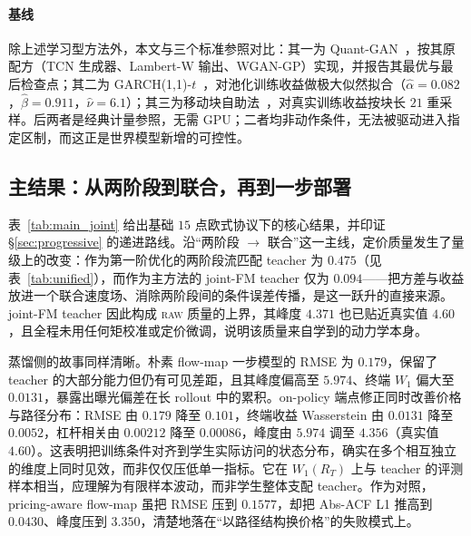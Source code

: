 \documentclass[11pt]{ctexart}
\newcommand{\raw}{\textsc{raw}}
\begin{document}
\paragraph{基线}
除上述学习型方法外，本文与三个标准参照对比：其一为 Quant-GAN~\citep{wiese2020quant}，按其原配方（TCN 生成器、Lambert-W 输出、WGAN-GP）实现，并报告其最优与最后检查点；其二为 GARCH(1,1)-$t$~\citep{bollerslev1986garch,bollerslev1987conditionally}，对池化训练收益做极大似然拟合（$\hat\alpha{=}0.082$，$\hat\beta{=}0.911$，$\hat\nu{=}6.1$）；其三为移动块自助法~\citep{kunsch1989jackknife,politis1994stationary}，对真实训练收益按块长 $21$ 重采样。后两者是经典计量参照，无需 GPU；二者均非动作条件，无法被驱动进入指定区制，而这正是世界模型新增的可控性。

\subsection{主结果：从两阶段到联合，再到一步部署}
\label{sec:res_main}
表~\ref{tab:main_joint} 给出基础 $15$ 点欧式协议下的核心结果，并印证 \S\ref{sec:progressive} 的递进路线。沿“两阶段 $\to$ 联合”这一主线，定价质量发生了量级上的改变：作为第一阶优化的两阶段流匹配 teacher 为 $0.475$（见表~\ref{tab:unified}），而作为主方法的 joint-FM teacher 仅为 $0.094$——把方差与收益放进一个联合速度场、消除两阶段间的条件误差传播，是这一跃升的直接来源。joint-FM teacher 因此构成 \raw{} 质量的上界，其峰度 $4.371$ 也已贴近真实值 $4.60$，且全程未用任何矩校准或定价微调，说明该质量来自学到的动力学本身。

蒸馏侧的故事同样清晰。朴素 flow-map 一步模型的 RMSE 为 $0.179$，保留了 teacher 的大部分能力但仍有可见差距，且其峰度偏高至 $5.974$、终端 $W_1$ 偏大至 $0.0131$，暴露出曝光偏差在长 rollout 中的累积。on-policy 端点修正同时改善价格与路径分布：RMSE 由 $0.179$ 降至 $0.101$，终端收益 Wasserstein 由 $0.0131$ 降至 $0.0052$，杠杆相关由 $0.00212$ 降至 $0.00086$，峰度由 $5.974$ 调至 $4.356$（真实值 $4.60$）。这表明把训练条件对齐到学生实际访问的状态分布，确实在多个相互独立的维度上同时见效，而非仅仅压低单一指标。它在 $W_1(R_T)$ 上与 teacher 的评测样本相当，应理解为有限样本波动，而非学生整体支配 teacher。作为对照，pricing-aware flow-map 虽把 RMSE 压到 $0.1577$，却把 Abs-ACF L1 推高到 $0.0430$、峰度压到 $3.350$，清楚地落在“以路径结构换价格”的失败模式上。
\end{document}
